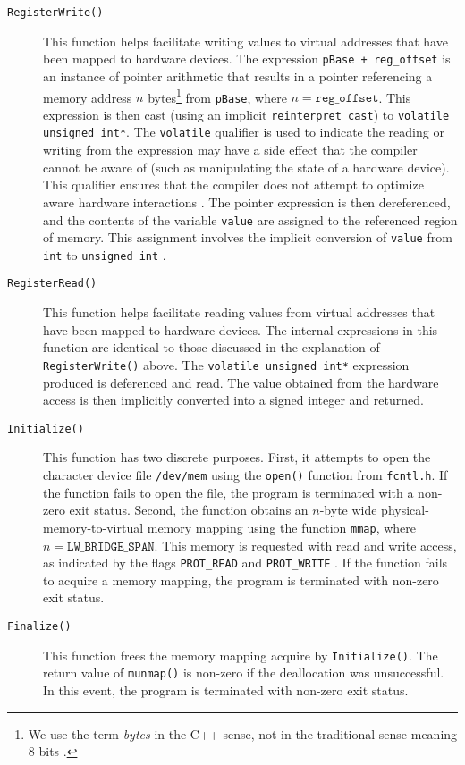 \documentclass[11pt, letterpaper]{article} %
\begin{document}
\begin{description}
    \item[\texttt{RegisterWrite()}] This function helps facilitate writing values to virtual addresses that have been mapped to hardware devices. The expression \texttt{pBase + reg\_offset} is an instance of pointer arithmetic that results in a pointer referencing a memory address $n$ bytes\footnote{We use the term \emph{bytes} in the C++ sense, not in the traditional sense meaning 8 bits \cite[\S4.4c1]{open-std-N4659}.} from \texttt{pBase}, where $n = \texttt{reg\_offset}$.  This expression is then cast (using an implicit \texttt{reinterpret\_cast}) to \texttt{volatile unsigned int*}. The \texttt{volatile} qualifier is used to indicate the reading or writing from the expression may have a side effect that the compiler cannot be aware of (such as manipulating the state of a hardware device). This qualifier ensures that the compiler does not attempt to optimize aware hardware interactions \cite[4.6c7.1]{open-std-N4659}. The pointer expression is then dereferenced, and the contents of the variable \texttt{value} are assigned to the referenced region of memory. This assignment involves the implicit conversion of \texttt{value} from \texttt{int} to  \texttt{unsigned int} \cite[7.8c2]{open-std-N4659}.
    
    \item[\texttt{RegisterRead()}] This function helps facilitate reading values from virtual addresses that have been mapped to hardware devices. The internal expressions in this function are identical to those discussed in the explanation of \texttt{RegisterWrite()} above. The \texttt{volatile unsigned int*} expression produced is deferenced and read. The value obtained from the hardware access is then implicitly converted into a signed integer and returned.
    
    \item[\texttt{Initialize()}] This function has two discrete purposes. First, it attempts to open the character device file \texttt{/dev/mem} \cite{man-dev-meme} using the \texttt{open()} function from \texttt{fcntl.h}. If the function fails to open the file, the program is terminated with a non-zero exit status. Second, the function obtains an $n$-byte wide physical-memory-to-virtual memory mapping using the function \texttt{mmap}, where $n=\texttt{LW\_BRIDGE\_SPAN}$. This memory is requested with read and write access, as indicated by the flags \texttt{PROT\_READ} and \texttt{PROT\_WRITE} \cite{man-mmap}. If the function fails to acquire a memory mapping, the program is terminated with non-zero exit status.
    
    \item[\texttt{Finalize()}] This function frees the memory mapping acquire by \texttt{Initialize()}. The return value of \texttt{munmap()} is non-zero if the deallocation was unsuccessful. In this event, the program is terminated with non-zero exit status.
\end{description}
\end{document}
